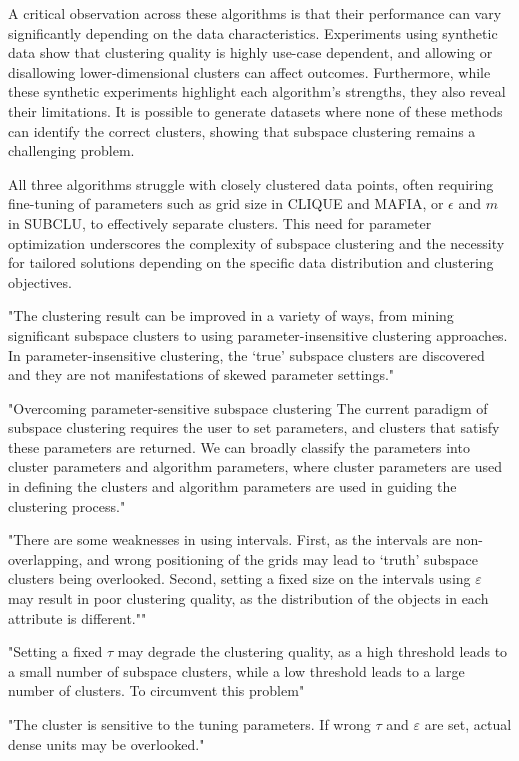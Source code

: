 A critical observation across these algorithms is that their performance can vary significantly depending on the data characteristics. Experiments using synthetic data show that clustering quality is highly use-case dependent, and allowing or disallowing lower-dimensional clusters can affect outcomes. Furthermore, while these synthetic experiments highlight each algorithm’s strengths, they also reveal their limitations. It is possible to generate datasets where none of these methods can identify the correct clusters, showing that subspace clustering remains a challenging problem.

All three algorithms struggle with closely clustered data points, often requiring fine-tuning of parameters such as grid size in CLIQUE and MAFIA, or \( \epsilon \) and \( m \) in SUBCLU, to effectively separate clusters. This need for parameter optimization underscores the complexity of subspace clustering and the necessity for tailored solutions depending on the specific data distribution and clustering objectives.


"The clustering result can be improved in a variety of ways, from mining significant subspace clusters to using parameter-insensitive clustering approaches. In parameter-insensitive clustering, the ‘true’ subspace clusters are discovered and they are not manifestations of skewed parameter settings." \cite{sim-2012}

"Overcoming parameter-sensitive subspace clustering The current paradigm of subspace clustering requires the user to set parameters, and clusters that satisfy these parameters are returned. We can broadly classify the parameters into cluster parameters and algorithm parameters, where cluster parameters are used in defining the clusters and algorithm parameters are used in guiding the clustering process." \cite{sim-2012}

"There are some weaknesses in using intervals. First, as the intervals are non-overlapping, and wrong positioning of the grids may lead to ‘truth’ subspace clusters being overlooked. Second, setting a ﬁxed size on the intervals using $\varepsilon$ may result in poor clustering quality, as the distribution of the objects in each attribute is different."" \cite{sim-2012}

"Setting a ﬁxed $\tau$ may degrade the clustering quality, as a high threshold leads to a small number of subspace clusters, while a low threshold leads to a large number of clusters. To circumvent this problem" \cite{sim-2012}

"The cluster is sensitive to the tuning parameters. If wrong $\tau$ and $\varepsilon$ are set, actual dense units may be overlooked." \cite{sim-2012}

